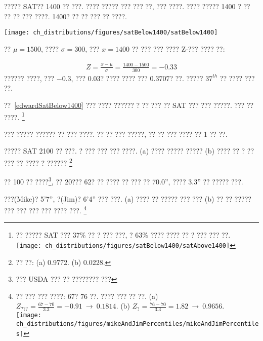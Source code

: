 \begin{example}{????? SAT?? 1400 ?? ???. ???? ????? ??? ???} \label{edwardSatBelow1400}
??, ??? ????. ???? ????? 1400 ? ?? ?? ?? ??? ????. 1400? ?? ?? ??? ?? ????.
\begin{center}
\texttt{[image: ch\_distributions/figures/satBelow1400/satBelow1400]}
\end{center}

?? $\mu=1500$, ???? $\sigma=300$, ??? $x=1400$ ?? ??? ??? ???? Z-??? ???? ??:

\begin{eqnarray*}
Z = \frac{x - \mu}{\sigma} = \frac{1400 - 1500}{300} = -0.33
\end{eqnarray*}
?????? ????, ??? $-0.3$, ??? $0.03$? ???? ???? ??? $0.3707$? ??. ????? $37^{th}$ ?? ???? ??? ??.
\end{example}

\begin{exercise}
??~\ref{edwardSatBelow1400} ??? ???? ?????? ? ?? ??? ?? SAT ??? ??? ?????. ??? ?? ????.
\footnote{?? ????? SAT ??? 37\% ?? ? ??? ???, ? 63\% ???? ???? ?? ? ??? ??? ??.\\
\texttt{[image: ch\_distributions/figures/satBelow1400/satAbove1400]}}
\end{exercise}

\begin{tipBox}{
??? ????? ?????? ?? ??? ????. ?? ?? ??? ?????, ?? ?? ??? ???? ?? 1 ?? ??.}
\end{tipBox}

\begin{exercise}
????? SAT 2100 ?? ???. ? ??? ??? ??? ????. (a) ???? ????? ????? (b) ???? ?? ? ?? ??? ?? ???? ? ??????
\footnote{?? ??: (a) 0.9772. (b) 0.0228.}
\end{exercise}

?? 100 ?? ????\footnote{??? USDA ??? ?? ???????? ???}, ?? 20??? 62? ?? ???? ?? ??? ?? 70.0'', ???? 3.3'' ?? ????? ???.

\begin{exercise}
???(Mike)? 5'7'', ?(Jim)? 6'4'' ??? ???. (a) ???? ?? ????? ??? ??? (b) ?? ?? ????? ??? ??? ??? ??? ???? ???.
\footnote{?? ??? ??? ????: 67? 76 ??. ???? ??? ?? ??. (a) $Z_{???} = \frac{67 - 70}{3.3} = -0.91\ \to\ 0.1814$. (b) $Z_{?} = \frac{76 - 70}{3.3} = 1.82\ \to\ 0.9656$. \\\texttt{[image: ch\_distributions/figures/mikeAndJimPercentiles/mikeAndJimPercentiles]}}
\end{exercise}

